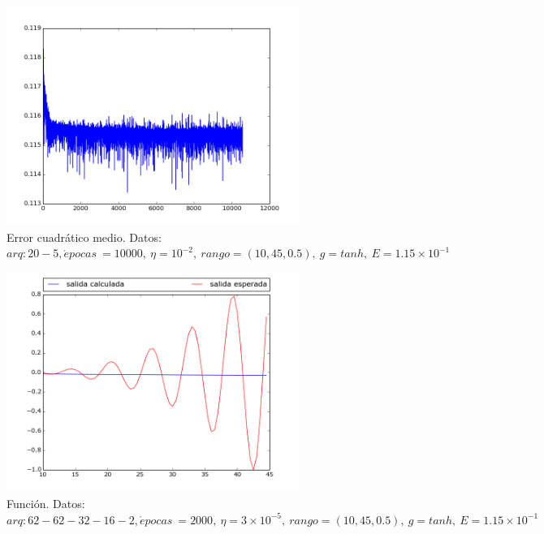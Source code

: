 \documentclass[12pt,a4paper]{article}
\begin{document}
\begin{figure}[H]
\centering
\includegraphics[width=0.85\textwidth]{img/_20__5_-eta_0_01-ERROR.png}
\caption{\label{fig:test1err} Error cuadrático medio. Datos:  $arq: 20-5, \acute{e} pocas \ = 10000,\ \eta = 10^{-2}, \ rango=(10, 45, 0.5),\ g=tanh, \ E = 1.15 \times 10^{-1}$ }
\end{figure}

\begin{figure}[H]
\centering
\includegraphics[width=0.85\textwidth]{img/_62__62__32__16__2_-eta_3_0000000000000004e-05-FUNCTION.png}
\caption{\label{fig:test2} Función. Datos:  $arq: 62-62-32-16-2, \acute{e} pocas \ = 2000,\ \eta = 3 \times 10^{-5}, \ rango=(10, 45, 0.5),\ g=tanh, \ E = 1.15 \times 10^{-1}$}
\end{figure}
\end{document}
